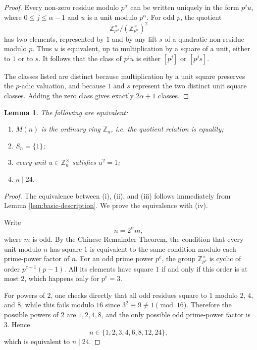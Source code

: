 \documentclass[a4paper,10pt]{article}
\newtheorem{lem}[teo]{Lemma} %
\newcommand{\cl}[1]{\left[#1\right]}
\begin{document}
\begin{proof}
Every non-zero residue modulo $p^\alpha$ can be written uniquely in the form $p^j u$, where $0\le j\le \alpha-1$ and $u$ is a unit modulo $p^\alpha$.  For odd $p$, the quotient
\[
        \mathbb Z_{p^\alpha}^\times/(\mathbb Z_{p^\alpha}^\times)^2
\]
has two elements, represented by $1$ and by any lift $s$ of a quadratic non-residue modulo $p$.  Thus $u$ is equivalent, up to multiplication by a square of a unit, either to $1$ or to $s$.  It follows that the class of $p^j u$ is either $\cl{p^j}$ or $\cl{p^j s}$.

The classes listed are distinct because multiplication by a unit square preserves the $p$-adic valuation, and because $1$ and $s$ represent the two distinct unit square classes.  Adding the zero class gives exactly $2\alpha+1$ classes.
\end{proof}

\begin{lem}\label{lem:square-subgroup-trivial}
The following are equivalent:
\begin{enumerate}[i -]
    \item $M(n)$ is the ordinary ring $\mathbb Z_n$, i.e. the quotient relation is equality;
    \item $S_n=\{1\}$;
    \item every unit $u\in\mathbb Z_n^\times$ satisfies $u^2=1$;
    \item $n\mid24$.
\end{enumerate}
\end{lem}

\begin{proof}
The equivalence between (i), (ii), and (iii) follows immediately from Lemma \ref{lem:basic-description}.  We prove the equivalence with (iv).

Write
\[
        n=2^\alpha m,
\]
where $m$ is odd.  By the Chinese Remainder Theorem, the condition that every unit modulo $n$ has square $1$ is equivalent to the same condition modulo each prime-power factor of $n$.  For an odd prime power $p^e$, the group $\mathbb Z_{p^e}^\times$ is cyclic of order $p^{e-1}(p-1)$.  All its elements have square $1$ if and only if this order is at most $2$, which happens only for $p^e=3$.

For powers of $2$, one checks directly that all odd residues square to $1$ modulo $2$, $4$, and $8$, while this fails modulo $16$ since $3^2\equiv9\not\equiv1\pmod{16}$.  Therefore the possible powers of $2$ are $1,2,4,8$, and the only possible odd prime-power factor is $3$.  Hence
\[
        n\in\{1,2,3,4,6,8,12,24\},
\]
which is equivalent to $n\mid24$.
\end{proof}
\end{document}
